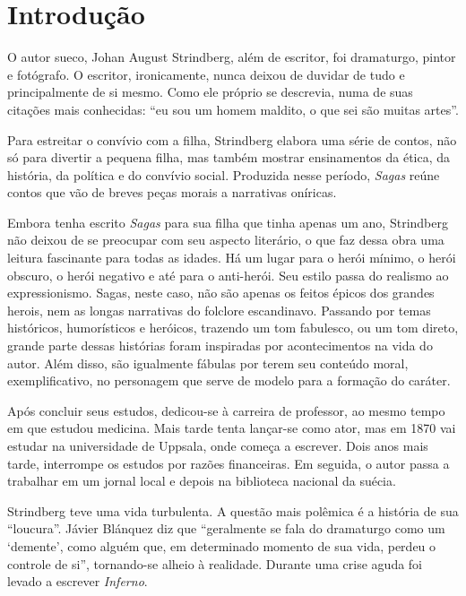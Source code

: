 \documentclass[12pt]{extarticle}
\begin{document}
\tableofcontents


\section{Introdução}

O autor sueco, Johan August Strindberg, além de escritor, foi dramaturgo, pintor e fotógrafo.
O escritor, ironicamente, nunca deixou de duvidar de tudo e principalmente de si mesmo.
Como ele próprio se descrevia, numa de suas citações mais conhecidas: “eu sou um homem maldito, o que sei são muitas artes”.

Para estreitar o convívio com a filha, Strindberg elabora uma série de contos, não só para divertir a pequena filha, mas também mostrar ensinamentos da ética, da história, da política e do convívio social.
Produzida nesse período, \textit{Sagas} reúne contos que vão de breves peças morais a narrativas oníricas.

Embora tenha escrito  \textit{Sagas} para sua filha que tinha apenas um ano, Strindberg não deixou de se preocupar com seu aspecto literário, o que faz dessa obra uma leitura fascinante para todas as idades.
Há um lugar para o herói mínimo, o herói obscuro, o herói negativo e até para o anti-herói.
Seu estilo passa do realismo ao expressionismo. 
Sagas, neste caso, não são apenas os feitos épicos dos grandes herois, nem as longas narrativas do folclore escandinavo.
Passando por temas históricos, humorísticos e heróicos, trazendo um tom fabulesco, ou um tom direto, grande parte dessas histórias foram inspiradas por acontecimentos na vida do autor.
Além disso, são igualmente fábulas por terem seu conteúdo moral, exemplificativo, no personagem que serve de modelo para a formação do caráter.


Após concluir seus estudos, dedicou-se à carreira de professor, ao mesmo tempo em que estudou medicina.
Mais tarde tenta lançar-se como ator, mas em 1870 vai estudar na universidade de Uppsala, 
onde começa a escrever. Dois anos mais tarde, interrompe os estudos por razões financeiras.
Em seguida, o autor passa a trabalhar em um jornal local e depois na biblioteca nacional da suécia.

Strindberg teve uma vida turbulenta. A questão mais polêmica é a história de sua “loucura”. Jávier 
Blánquez diz que “geralmente se fala do dramaturgo como um ‘demente’, como alguém que, em determinado momento de sua vida, perdeu o controle de si”, tornando-se alheio à realidade. 
Durante uma crise aguda foi levado a escrever \textit{Inferno}.
\end{document}
